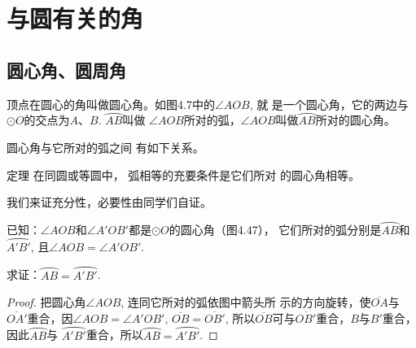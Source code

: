 \section{与圆有关的角}
\subsection{圆心角、圆周角}
顶点在圆心的角叫做圆心角。如图4.7中的$\angle AOB$, 就
是一个圆心角，它的两边与$\odot O$的交点为$A$、$B$. $\wideparen{AB}$叫做
$\angle AOB$所对的弧，$\angle AOB$叫做$\wideparen{AB}$所对的圆心角。

圆心角与它所对的弧之间
有如下关系。

\begin{blk}
    {定理} 在同圆或等圆中，
弧相等的充要条件是它们所对
的圆心角相等。
\end{blk}

我们来证充分性，必要性由同学们自证。

已知：$\angle AOB$和$\angle A'OB'$都是$\odot O$的圆心角（图4.47），
它们所对的弧分别是$\wideparen{AB}$和$\wideparen{A'B'}$, 且$\angle AOB=\angle A'OB'$.

求证：$\wideparen{AB}=\wideparen{A'B'}$.

\begin{proof}
    把圆心角$\angle AOB$, 连同它所对的弧依图中箭头所
示的方向旋转，使$\overline{OA}$与$\overline{OA'}$重合，因$\angle AOB=\angle A'OB'$, 
$\overline{OB}=\overline{OB'}$, 所以$\overline{OB}$可与$\overline{OB'}$重合，$B$与$B'$重合，因此$\wideparen{AB}$与
$\wideparen{A'B'}$重合，所以$\wideparen{AB}=\wideparen{A'B'}$. 
\end{proof}


\begin{figure}[htp]\centering
    \begin{minipage}[t]{0.48\textwidth}
    \centering
    \caption{}
    \end{minipage}
    \begin{minipage}[t]{0.48\textwidth}
    \centering
    \caption{}
    \end{minipage}
    \end{figure}


